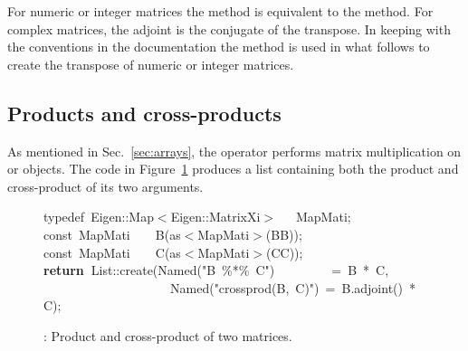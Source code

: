 \documentclass[shortnames,article]{jss}
\newcommand{\hlstd}[1]{\textcolor[rgb]{0,0,0}{#1}}
\newcommand{\hlopt}[1]{\textcolor[rgb]{0,0,0}{#1}}
\newcommand{\hlstr}[1]{\textcolor[rgb]{0.90,0.15,0.15}{#1}}
\newcommand{\hlkwa}[1]{\textcolor[rgb]{0.61,0.13,0.93}{\bf{#1}}}
\newcommand{\hlkwb}[1]{\textcolor[rgb]{0.13,0.54,0.13}{#1}}
\newcommand{\hlkwc}[1]{\textcolor[rgb]{0,0,1}{#1}}
\newcommand{\hlkwd}[1]{\textcolor[rgb]{0,0,0}{#1}}
\begin{document}
For numeric or integer matrices the  method is
equivalent to the  method.  For complex matrices,
the adjoint is the conjugate of the transpose.  In keeping with the
conventions in the  documentation the 
method is used in what follows to create the transpose of numeric or
integer matrices.


\subsection{Products and cross-products}
\label{sec:products}

As mentioned in Sec.~\ref{sec:arrays}, the  operator
performs matrix multiplication on  or
 objects. The  code in
Figure~\ref{prod} produces a list containing both the product and
cross-product of its two arguments.

\begin{figure}[htb]
  \noindent
  \ttfamily
  \hlstd{}\hlkwc{typedef\ }\hlstd{Eigen}\hlopt{::}\hlstd{Map}\hlopt{$<$}\hlstd{Eigen}\hlopt{::}\hlstd{MatrixXi}\hlopt{$>$}\hlstd{\ \ \ }\hlopt{}\hlstd{MapMati}\hlopt{;}\hspace*{\fill}\\
  \hlstd{}\hlkwb{const\ }\hlstd{MapMati}\hlstd{\ \ \ \ }\hlstd{}\hlkwd{B}\hlstd{}\hlopt{(}\hlstd{as}\hlopt{$<$}\hlstd{MapMati}\hlopt{$>$(}\hlstd{BB}\hlopt{));}\hspace*{\fill}\\
  \hlstd{}\hlkwb{const\ }\hlstd{MapMati}\hlstd{\ \ \ \ }\hlstd{}\hlkwd{C}\hlstd{}\hlopt{(}\hlstd{as}\hlopt{$<$}\hlstd{MapMati}\hlopt{$>$(}\hlstd{CC}\hlopt{));}\hspace*{\fill}\\
  \hlstd{}\hlkwa{return\ }\hlstd{List}\hlopt{::}\hlstd{}\hlkwd{create}\hlstd{}\hlopt{(}\hlstd{Named}\hlopt{{(}}\hlstd{}\hlstr{"B\ \%{*}\%\ C"}\hlstd{}\hlopt{{)}}\hlstd{\ \ \ \ \ \ \ \ \ }\hlopt{=\ }\hlstd{B\ }\hlopt{{*}\ }\hlstd{C}\hlopt{,}\hspace*{\fill}\\
  \hlstd{}\hlstd{\ \ \ \ \ \ \ \ \ \ \ \ \ \ \ \ \ \ \ \ }\hlstd{Named}\hlopt{{(}}\hlstd{}\hlstr{"crossprod(B,\ C)"}\hlstd{}\hlopt{{)}\ =\ }\hlstd{B}\hlopt{.}\hlstd{}\hlkwd{adjoint}\hlstd{}\hlopt{()\ {*}\ }\hlstd{C}\hlopt{);}\hlstd{}\hspace*{\fill}\\
  \mbox{}
  \normalfont
  \normalsize
  \caption{: Product and cross-product of two matrices.}
  \label{prod}
\end{figure}
\end{document}
